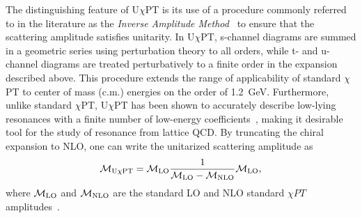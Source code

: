 \documentclass[twocolumn,hyperpdf,
amsmath,amssymb,
aps,prd,10pt,
superscriptaddress,nofootinbib,noeprint,preprintnumbers]{revtex4-1}
\begin{document}
The distinguishing feature of U$\chi$PT is its use of a procedure commonly referred to in the literature as the \emph{Inverse Amplitude Method}~\cite{Oller:1997ng, Oller:1998hw, GomezNicola:2001as} to ensure that the scattering amplitude satisfies unitarity.  In U$\chi$PT, s-channel diagrams are summed in a geometric series using perturbation theory to all orders, while t- and u-channel diagrams are treated perturbatively to a finite order in the expansion described above. This procedure extends the range of applicability of standard $\chi$PT to center of mass (c.m.) energies on the order of 1.2~GeV. Furthermore, unlike standard $\chi$PT, U$\chi$PT has been shown to accurately describe low-lying resonances with a finite number of low-energy coefficients~\cite{Oller:1997ng, Oller:1998hw, GomezNicola:2001as}, making it desirable tool for the study of resonance from lattice QCD. By truncating the chiral expansion to NLO, one can write the unitarized scattering amplitude as
\begin{align}
\mathcal{M}_{\rm U\chi PT}
=\mathcal{M}_{\rm LO}\frac{1}{\mathcal{M}_{\rm LO}-\mathcal{M}_{\rm NLO}}
\mathcal{M}_{\rm LO},
\end{align}
where $\mathcal{M}_{\rm LO}$ and $\mathcal{M}_{\rm NLO}$ are the standard LO and NLO standard $\chi PT$ amplitudes~\cite{Weinberg:1966kf, Colangelo:2001df,Ecker:1988te,Gasser:1984gg,Gasser:1983yg,Gasser:1983kx}.
\end{document}
